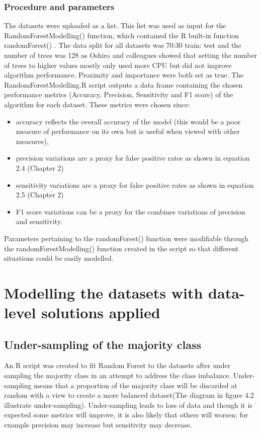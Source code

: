 \subsubsection{Procedure and parameters}
The datasets were uploaded as a list. This list was used as input for the RandomForestModelling() function, which contained the R built-in function randomForest() \citep{Anonymous:eo5jDFnb}. 
The data split for all datasets was 70:30 train: test and the number of trees was 128 as Oshiro and colleagues showed that setting the number of trees to higher values mostly only used more CPU but did not improve algorithm performance\citep{MayumiOshiro:ve}. Proximity and importance were both set as true.\newline
The RandomForestModelling.R script outputs a data frame containing the chosen performance metrics (Accuracy, Precision, Sensitivity and F1 score) of the algorithm for each dataset.\newline
These metrics were chosen since:
\begin{itemize}
    \item accuracy reflects the overall accuracy of the model (this would be a poor measure of performance on its own but is useful when viewed with other measures), 
    \item precision variations are a proxy for false positive rates as shown in equation 2.4 (Chapter 2)
    \item sensitivity variations are a proxy for false positive rates as shown in equation 2.5 (Chapter 2)
    \item F1 score variations can be a proxy for the combines variations of precision and sensitivity.
\end{itemize}
Parameters pertaining to the randomForest() function were modifiable through the randomForestModelling() function created in the script so that different situations could be easily modelled.\newline

\section{Modelling the datasets with data-level solutions applied}
\subsection{Under-sampling of the majority class}
An R script was created to fit Random Forest to the datasets after under sampling the majority class in an attempt to address the class imbalance.\newline
Under-sampling means that a proportion of the majority class will be discarded at random with a view to create a more balanced dataset(The diagram in figure 4.2 illustrate under-sampling).\newline
Under-sampling leads to loss of data and though it is expected some metrics will improve, it is also likely that others will worsen; for example precision may increase but sensitivity may decrease.\newline

